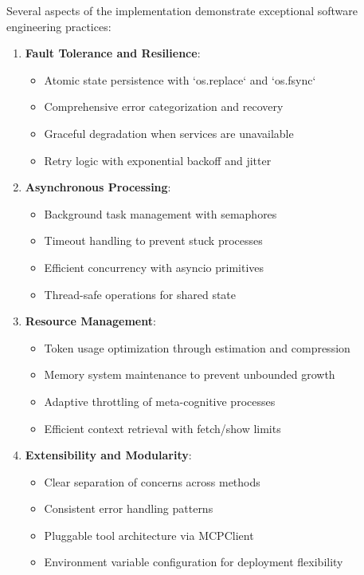 \documentclass[12pt,a4paper]{article}
\begin{document}
Several aspects of the implementation demonstrate exceptional software engineering practices:

\begin{enumerate}[label=\arabic*.]
    \item \textbf{Fault Tolerance and Resilience}:
    \begin{itemize}
        \item Atomic state persistence with `os.replace` and `os.fsync`
        \item Comprehensive error categorization and recovery
        \item Graceful degradation when services are unavailable
        \item Retry logic with exponential backoff and jitter
    \end{itemize}
    \item \textbf{Asynchronous Processing}:
    \begin{itemize}
        \item Background task management with semaphores
        \item Timeout handling to prevent stuck processes
        \item Efficient concurrency with asyncio primitives
        \item Thread-safe operations for shared state
    \end{itemize}
    \item \textbf{Resource Management}:
    \begin{itemize}
        \item Token usage optimization through estimation and compression
        \item Memory system maintenance to prevent unbounded growth
        \item Adaptive throttling of meta-cognitive processes
        \item Efficient context retrieval with fetch/show limits
    \end{itemize}
    \item \textbf{Extensibility and Modularity}:
    \begin{itemize}
        \item Clear separation of concerns across methods
        \item Consistent error handling patterns
        \item Pluggable tool architecture via MCPClient
        \item Environment variable configuration for deployment flexibility
    \end{itemize}
\end{enumerate}
\end{document}
